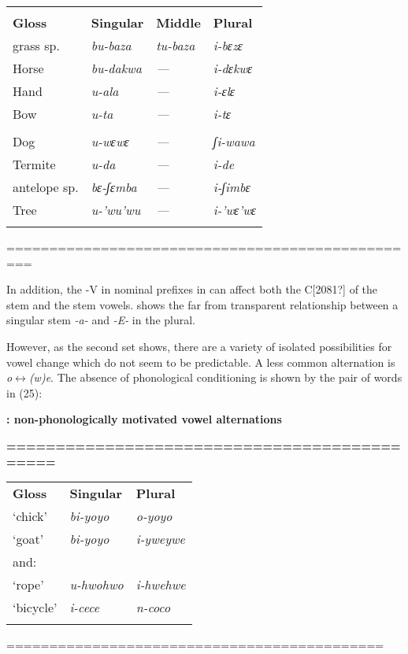 \documentclass[output=paper]{langsci/langscibook}
\begin{document}
\begin{tabularx}{\textwidth}{XXXX}
\lsptoprule
\multicolumn{4}{c}{{\itshape \textbf{{\tabref{tab:key:24}:}}\textbf{ {a/E vowel alternations in \ili{Basa} number marking}}}

\itshape \textbf{{========================================}}}\\
\textbf{Gloss} & \textbf{Singular} & \textbf{Middle} & \textbf{Plural}\\
grass sp. &  \textit{bu-baza} &  \textit{tu-baza} &  \textit{i-bɛzɛ}\\
Horse &  \textit{bu-dakwa} & \textit{—} &  \textit{i-dɛkwɛ}\\
Hand &  \textit{u-ala} & \textit{—} &  \textit{i-ɛlɛ}\\
Bow &  \textit{u-ta} & \textit{—} &  \textit{i-tɛ}\\
&  &  & \\
Dog &  \textit{u-wɛwɛ} & \textit{—} &  \textit{ʃi-wawa}\\
Termite &  \textit{u-da} & \textit{—} &  \textit{i-de}\\
antelope sp. &  \textit{bɛ-ʃɛmba} & \textit{—} &  \textit{i-ʃimbɛ}\\
Tree &  \textit{u-’wu’wu} & \textit{—} &  \textit{i-’wɛ’wɛ}\\
\lspbottomrule
\end{tabularx}
=================================================

In addition, the -V in nominal prefixes in  can affect both the C[2081?] of the stem and the stem vowels.  shows the far from transparent relationship between a singular stem \textit{{}-a-} and \textit{{}-E-} in the plural.

However, as the second set shows, there are a variety of isolated possibilities for vowel change which do not seem to be predictable. A less common alternation is \textit{o$\leftrightarrow $(w)e}. The absence of phonological conditioning is shown by the pair of words in (25):


\textbf{{: non-phonologically motivated vowel alternations} }



\textbf{{=============================================}}


\begin{tabularx}{\textwidth}{XXX}
\lsptoprule
\textbf{Gloss} & \textbf{Singular} & \textbf{Plural}\\
‘chick’ &  \textit{bi-yoyo} &  \textit{o-yoyo}\\
‘goat’ &  \textit{bi-yoyo} &  \textit{i-yweywe}\\
and: &  & \\
‘rope’ &  \textit{u-hwohwo} &  \textit{i-hwehwe}\\
‘bicycle’ &  \textit{i-cece} &  \textit{n-coco}\\
\lspbottomrule
\end{tabularx}
  ============================================
\end{document}
